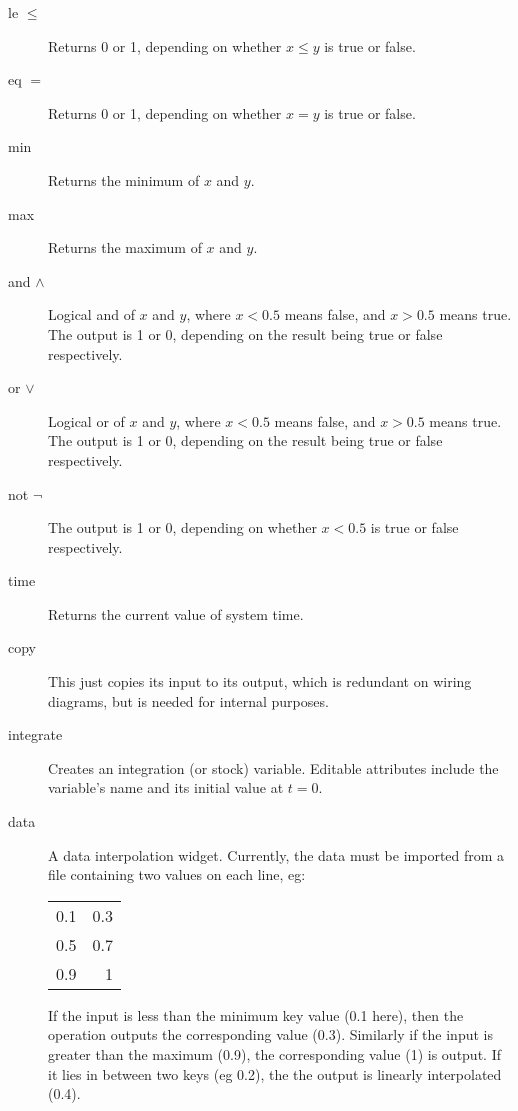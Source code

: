 \begin{description}
\item[le $\le$]\label{op:le} Returns 0 or 1, depending
  on whether $x\le y$ is true or false.

\item[eq $=$]\label{op:eq} Returns 0 or 1, depending
  on whether $x=y$ is true or false.

\item[min]\label{op:min} Returns the minimum of $x$ and $y$.

\item[max]\label{op:max} Returns the maximum of $x$ and $y$.

\item[and $\wedge$]\label{op:and_} Logical and of $x$ and $y$, where $x<0.5$
  means false, and $x>0.5$ means true. The output is 1 or 0, depending
  on the result being true or false respectively.

\item[or $\vee$]\label{op:or_} Logical or of $x$ and $y$, where $x<0.5$
  means false, and $x>0.5$ means true. The output is 1 or 0, depending
  on the result being true or false respectively.

\item[not $\neg$]\label{op:not_} The output is 1 or 0, depending
  on whether $x<0.5$ is true or false respectively.

\item[time]\label{op:time} Returns the current value of system time.

\item[copy]\label{op:copy} This just copies its input to its output,
which is redundant on wiring diagrams, but is needed for internal
purposes.

\item[integrate]\label{op:integrate} Creates an integration (or stock)
variable. Editable attributes include the variable's name and its
initial value at $t=0$.

\item[data]\label{op:data} A data interpolation widget. Currently, the
data must be imported from a file containing two values on each line,
eg:
\begin{tabular}{rr}
0.1 &0.3\\
0.5 &0.7\\
0.9 &1\\
\end{tabular}
If the input is less than the minimum key value (0.1 here), then the
operation outputs the corresponding value (0.3). Similarly if the
input is greater than the maximum (0.9), the corresponding value (1)
is output. If it lies in between two keys (eg 0.2), the the output is
linearly interpolated (0.4).


\end{description}
